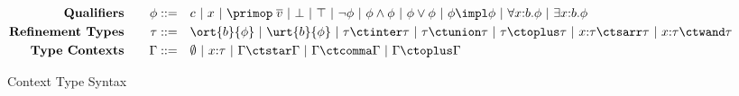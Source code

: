 \begin{figure}[h]
  { \small
    \begin{alignat*}{2}
      \text{\textbf{Qualifiers}}& \quad & \phi ::= \quad & c ~|~ x ~|~ \primop\;\overline{v} ~|~ \bot ~|~ \top  ~|~ \neg \phi ~|~ \phi \land \phi ~|~ \phi \lor \phi ~|~  \phi \impl \phi ~|~ \forall x{:}b. \phi ~|~ \exists x{:}b. \phi
      \\ \text{\textbf{Refinement Types}}& \quad & \tau ::= \quad & \ort{b}{\phi} ~|~ \urt{b}{\phi} ~|~ \tau \ctinter \tau ~|~ \tau \ctunion \tau ~|~ \tau \ctoplus \tau ~|~ x{:}\tau \ctsarr \tau ~|~ x{:}\tau \ctwand \tau
      \\ \text{\textbf{Type Contexts}}& \quad & \Gamma ::= \quad & \emptyset ~|~ x{:}\tau ~|~ \Gamma \ctstar \Gamma ~|~ \Gamma \ctcomma \Gamma ~|~ \Gamma \ctoplus \Gamma
    \end{alignat*}}
  \caption{Context Type Syntax}
  \label{fig:context-types-syntax}
\end{figure}

